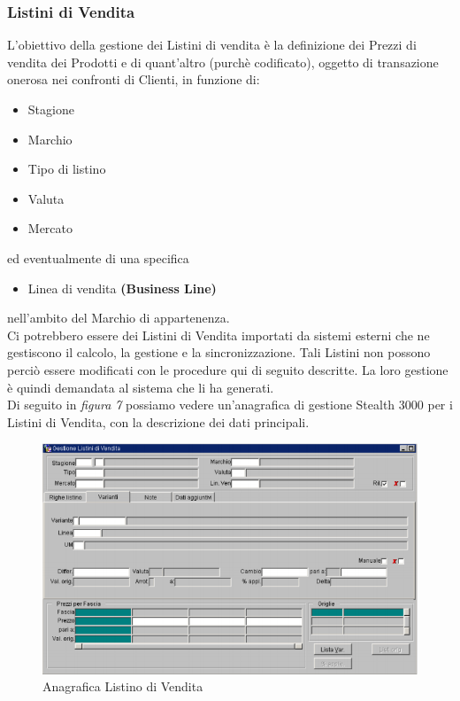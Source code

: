 \subsubsection{Listini di Vendita}
L'obiettivo della gestione dei Listini di vendita è la definizione dei Prezzi di vendita dei Prodotti e di quant’altro (purchè codificato), oggetto di transazione onerosa nei confronti di Clienti, in funzione di:
\begin{itemize}
\item Stagione
\item Marchio
\item Tipo di listino
\item Valuta
\item Mercato
\end{itemize}
ed eventualmente di una specifica
\begin{itemize}
\item Linea di vendita \textbf{(Business Line)}
\end{itemize}
nell’ambito del Marchio di appartenenza.\\
Ci potrebbero essere dei Listini di Vendita importati da sistemi esterni che ne gestiscono il calcolo, la gestione e la sincronizzazione. Tali Listini non possono perciò essere modificati con le procedure qui di seguito descritte. La loro gestione è quindi demandata al sistema che li ha generati.\\
Di seguito in \textit{figura 7} possiamo vedere un'anagrafica di gestione Stealth 3000 per i Listini di Vendita, con la descrizione dei dati principali.\\

\begin{figure}[!h]
\thispagestyle{empty}
\centering
\includegraphics[scale=0.90]{img/Listino.png}
\caption{Anagrafica Listino di Vendita}
\end{figure}
\newpage

